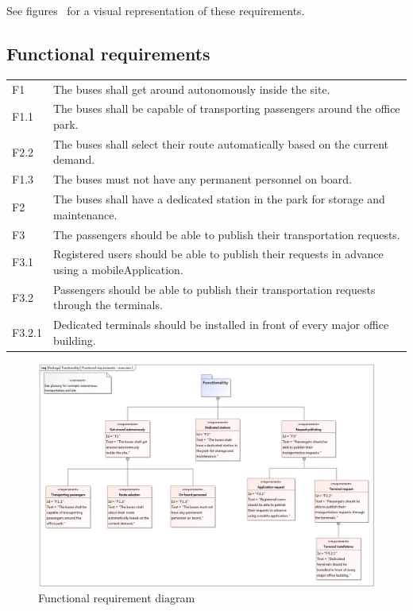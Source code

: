 \documentclass[a4paper]{article}
\begin{document}
See figures~ for a visual
representation of these requirements.

\subsection{Functional requirements}
\begin{tabularx}{\textwidth}{p{.75cm} X}
	F1     & The buses shall get around \gls{autonomous}ly inside the
	         \gls{site}. \\

	F1.1   & The buses shall be capable of transporting passengers around
	         the office park. \\

	F2.2   & The buses shall select their \gls{route} \gls{automatically}
	         based on the current demand. \\

        F1.3   & The buses must not have any permanent personnel on board. \\

	F2     & The buses shall have a dedicated \gls{station} in the park for
	         storage and maintenance. \\

	F3     & The passengers should be able to publish their
	         \gls{transportation} \gls{request}s. \\

	F3.1   & Registered users should be able to publish their \gls{request}s
	         in advance using a \gls{mobileApplication}. \\

	F3.2   & Passengers should be able to publish their \gls{transportation}
	         \gls{request}s through the \gls{terminal}s. \\

	F3.2.1 & Dedicated \gls{terminal}s should be installed in front of every
	         major office building. \\
\end{tabularx}

\begin{figure}
	\centering
	\includegraphics[width=\textwidth]{req-functional.jpg}
	\caption{Functional requirement diagram}%
	\label{fig:req-functional}
\end{figure}
\end{document}
